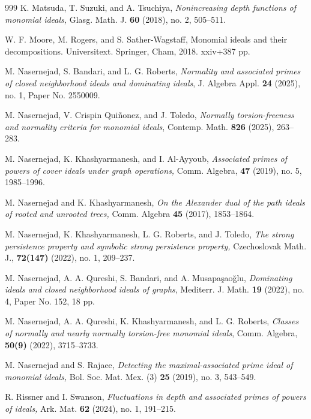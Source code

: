 \documentclass[11pt]{amsart}
\begin{document}
\begin{thebibliography}{999}
 K. Matsuda, T.  Suzuki, and A.  Tsuchiya, \textit{Nonincreasing depth functions of monomial ideals,}  Glasg. Math. J. \textbf{60}
 (2018), no. 2, 505--511. 


 W. F. Moore, M. Rogers, and S. Sather-Wagstaff,  Monomial ideals and their decompositions. Universitext. Springer, Cham, 2018. xxiv+387 pp. 



 M. Nasernejad, S. Bandari,  and L. G. Roberts, \textit{Normality and associated primes of closed neighborhood  ideals and dominating ideals}, 
J. Algebra Appl. \textbf{24} (2025), no. 1, Paper No. 2550009.


  M. Nasernejad,  V. Crispin  Qui\~nonez,  and   J. Toledo, \textit{Normally torsion-freeness and normality  criteria for monomial ideals}, 
Contemp. Math. \textbf{826} (2025), 263--283. 

    M. Nasernejad,  K. Khashyarmanesh, and  I. Al-Ayyoub, {\it Associated primes of powers  of cover ideals under graph operations,} Comm. 
Algebra, {\bf 47} (2019), no. 5, 1985--1996. 


    M. Nasernejad   and K. Khashyarmanesh, {\it On the Alexander dual of the path ideals of rooted and unrooted trees,} Comm. Algebra  
  {\bf 45} (2017), 1853--1864.


   M. Nasernejad,  K. Khashyarmanesh, L. G. Roberts, and J. Toledo, {\it The strong persistence property and symbolic strong persistence property,} {Czechoslovak Math. J.}, {\bf  72(147)}  (2022), no. 1, 209--237. 

 M. Nasernejad, A. A. Qureshi, S. Bandari, and A.  Musapa\c{s}ao\u{g}lu, {\it  Dominating ideals and closed neighborhood ideals of graphs}, Mediterr. J. Math. {\bf 19}  (2022), no. 4, Paper No. 152, 18 pp. 

  M. Nasernejad, A. A. Qureshi, K. Khashyarmanesh, and L. G. Roberts,  {\it Classes of normally and nearly normally torsion-free monomial ideals}, Comm. Algebra, {\bf 50(9)} (2022), 3715--3733. 


 M. Nasernejad and S.  Rajaee, \textit{Detecting the maximal-associated prime ideal of monomial ideals,}
 Bol. Soc. Mat. Mex. (3) \textbf{25} (2019), no. 3, 543--549. 


 R. Rissner and I.  Swanson, \textit{Fluctuations in depth and associated primes of powers of ideals,}  Ark. Mat. \textbf{62} (2024), no. 1, 191--215. 



\end{thebibliography}
\end{document}
